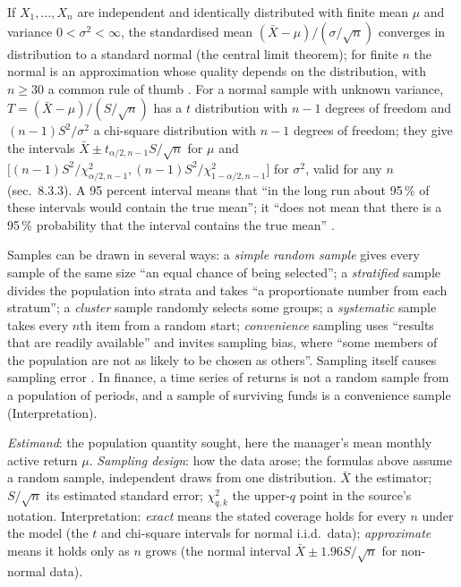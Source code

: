 \begin{qfmethod}\label{meth:confidence-intervals}
 If $X_1,\dots,X_n$ are independent and identically distributed with finite mean $\mu$ and variance $0<\sigma^2<\infty$, the standardised mean $(\bar X-\mu)/(\sigma/\sqrt n)$ converges in distribution to a standard normal (the central limit theorem); for finite $n$ the normal is an approximation whose quality depends on the distribution, with $n\ge30$ a common rule of thumb \citep[sec.~7.1.2]{probability-statistics-random-processes}. For a normal sample with unknown variance, $T=(\bar X-\mu)/(S/\sqrt n)$ has a $t$ distribution with $n-1$ degrees of freedom and $(n-1)S^2/\sigma^2$ a chi-square distribution with $n-1$ degrees of freedom; they give the intervals $\bar X\pm t_{\alpha/2,n-1}S/\sqrt n$ for $\mu$ and $\bigl[(n-1)S^2/\chi^2_{\alpha/2,n-1},(n-1)S^2/\chi^2_{1-\alpha/2,n-1}\bigr]$ for $\sigma^2$, valid for any $n$ (sec.~8.3.3). A 95 percent interval means that ``in the long run about 95\,\% of these intervals would contain the true mean''; it ``does not mean that there is a 95\,\% probability that the interval contains the true mean'' \citep[sec.~1.3.5.2]{statistical-methods-handbook}.

Samples can be drawn in several ways: a \emph{simple random sample} gives every sample of the same size ``an equal chance of being selected''; a \emph{stratified} sample divides the population into strata and takes ``a proportionate number from each stratum''; a \emph{cluster} sample randomly selects some groups; a \emph{systematic} sample takes every $n$th item from a random start; \emph{convenience} sampling uses ``results that are readily available'' and invites sampling bias, where ``some members of the population are not as likely to be chosen as others''. Sampling itself causes sampling error \citep[sec.~1.2]{introductory-statistics-2023}. In finance, a time series of returns is not a random sample from a population of periods, and a sample of surviving funds is a convenience sample (Interpretation).

 \emph{Estimand}: the population quantity sought, here the manager's mean monthly active return $\mu$. \emph{Sampling design}: how the data arose; the formulas above assume a random sample, independent draws from one distribution. $\bar X$ the estimator; $S/\sqrt n$ its estimated standard error; $\chi^2_{q,k}$ the upper-$q$ point in the source's notation. Interpretation: \emph{exact} means the stated coverage holds for every $n$ under the model (the $t$ and chi-square intervals for normal i.i.d.\ data); \emph{approximate} means it holds only as $n$ grows (the normal interval $\bar X\pm1.96S/\sqrt n$ for non-normal data).


\end{qfmethod}
